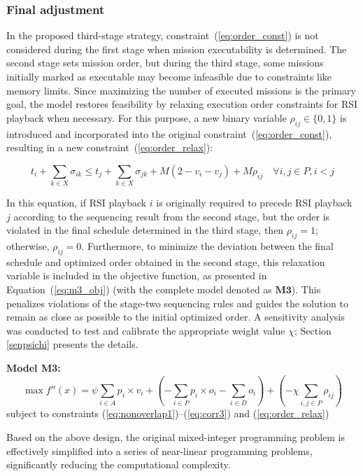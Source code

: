 \documentclass[preprint,3p,12pt,authoryear]{elsarticle}
\begin{document}
\subsubsection{Final adjustment}
In the proposed third-stage strategy, constraint~(\ref{eq:order_const}) is not considered during the first stage when mission executability is determined. The second stage sets mission order, but during the third stage, some missions initially marked as executable may become infeasible due to constraints like memory limits. Since maximizing the number of executed missions is the primary goal, the model restores feasibility by relaxing execution order constraints for RSI playback when necessary. For this purpose, a new binary variable $\rho_{ij} \in \{0, 1\}$ is introduced and incorporated into the original constraint~(\ref{eq:order_const}), resulting in a new constraint~(\ref{eq:order_relax}):

\begin{equation}
t_i + \sum_{k \in X} \sigma_{ik} \le t_j + \sum_{k \in X} \sigma_{jk} + M(2-v_i-v_j) + M\rho_{ij} \quad \forall i, j \in P, i<j \label{eq:order_relax}
\end{equation}

In this equation, if RSI playback $i$ is originally required to precede RSI playback $j$ according to the sequencing result from the second stage, but the order is violated in the final schedule determined in the third stage, then $\rho_{ij}=1$; otherwise, $\rho_{ij}=0$. Furthermore, to minimize the deviation between the final schedule and optimized order obtained in the second stage, this relaxation variable is included in the objective function, as presented in Equation~(\ref{eq:m3_obj}) (with the complete model denoted as $\textbf{M3}$). This penalizes violations of the stage-two sequencing rules and guides the solution to remain as close as possible to the initial optimized order. A sensitivity analysis was conducted to test and calibrate the appropriate weight value $\chi$; Section \ref{senpsichi} presents the details.

\noindent\textbf{Model M3:}
\begin{equation}
    \max f''(x) = \psi \sum_{i \in A} p_i \times v_i + (-\sum_{i \in P} p_i \times o_i - \sum_{i \in D} o_i) + (-\chi \sum_{i, j \in P} \rho_{ij}) \label{eq:m3_obj}
\end{equation}
subject to constraints (\ref{eq:nonoverlap1})–(\ref{eq:corr3}) and (\ref{eq:order_relax})

Based on the above design, the original mixed-integer programming problem is effectively simplified into a series of near-linear programming problems, significantly reducing the computational complexity.
\end{document}
